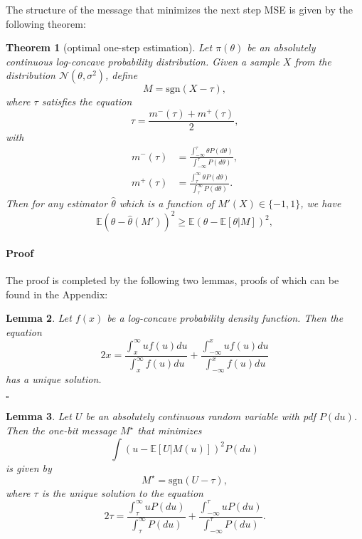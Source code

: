 \documentclass[letterpaper, conference]{IEEEtran}      %
\newtheorem{thm}{\bf{Theorem}}
\newtheorem{lem}[thm]{\bf {Lemma}}
\newenvironment{proof}{\paragraph*{Proof}}{\hfill$\square$ \newline}
\newcommand{\sgn}{\mathrm{sgn} }
\begin{document}
The structure of the message that minimizes the next step MSE is given by the following theorem:
\begin{thm}[optimal one-step estimation] \label{thm:opt_one_step}
Let $\pi(\theta)$ be an absolutely continuous log-concave probability distribution. Given a sample $X$ from the distribution $\mathcal N(\theta, \sigma^2)$, define 
\begin{equation}
\label{eq:adaptive_main_message}
M = \sgn(X - \tau),
\end{equation}
where $\tau$ satisfies the equation
\begin{equation}
 \label{eq:fixed_point}
 \tau = \frac{m^-(\tau) + m^+(\tau)}{2},
\end{equation}
with
\begin{align*}
m^-(\tau)  & = \frac{\int_{-\infty}^{\tau} \theta P(d\theta) }{\int_{-\infty}^{\tau} P(d\theta)} ,\\
m^+(\tau) & = \frac{\int_{\tau}^\infty \theta P(d\theta) }{\int_{\tau}^\infty P(d\theta)} .
\end{align*}
Then for any estimator $\widehat{\theta}$ which is a function of $M'(X) \in \{-1,1\}$, we have
\begin{equation}
\label{eq:opt_cond}
\mathbb E \left(\theta-\widehat{\theta}(M')\right)^2 \geq  \mathbb E \left(\theta- \mathbb E[\theta|M]\right)^2,
\end{equation}
\end{thm}

\begin{proof}
The proof is completed by the following two lemmas, proofs of which can be found in the Appendix:
\begin{lem} \label{lem:unique}
Let $f(x)$ be a log-concave probability density function. Then the equation 
\begin{equation}
\label{eq:lem_fixed_point}
2x = \frac{\int_x^\infty uf(u)du}{\int_x^\infty f(u)du} + \frac{\int_{-\infty}^x uf(u)du}{\int_{-\infty}^x f(u)du} 
\end{equation}
has a unique solution.
\end{lem}
\end{proof}

\begin{lem} \label{lem:adaptive}
Let $U$ be an absolutely continuous random variable with
pdf $P(du)$. Then the one-bit message $M^\star$ that minimizes
\[
\int \left( u - \mathbb E[U|M(u)]  \right)^2 P(du)
\]
is given by
\[
M^\star  =  \sgn(U - \tau),
\]
where $\tau$ is the unique solution to the equation
 \[
2 \tau = \frac{\int_{\tau}^\infty u P(du)} {\int_{\tau}^\infty P(du)} + \frac{\int_{-\infty}^{\tau} u P(du)}{\int_{-\infty}^{\tau} P(du)}.
\]
\end{lem}
\end{document}
